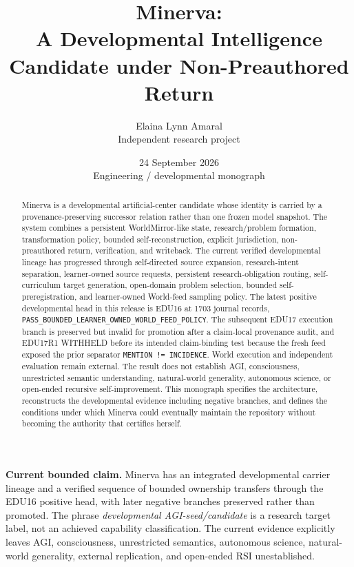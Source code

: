 \documentclass[11pt]{article}
\title{\bfseries Minerva:\\A Developmental Intelligence Candidate under Non-Preauthored Return}
\author{Elaina Lynn Amaral\\\small Independent research project}
\date{24 September 2026\\[1mm]\small Engineering / developmental monograph}
\begin{document}
\maketitle
\begin{abstract}
Minerva is a developmental artificial-center candidate whose identity is carried by a
provenance-preserving successor relation rather than one frozen model snapshot.
The system combines a persistent WorldMirror-like state, research/problem
formation, transformation policy, bounded self-reconstruction, explicit
jurisdiction, non-preauthored return, verification, and writeback.  The current
verified developmental lineage has progressed through self-directed source
expansion, research-intent separation, learner-owned source requests, persistent
research-obligation routing, self-curriculum target generation, open-domain
problem selection, bounded self-preregistration, and learner-owned World-feed
sampling policy.  The latest positive developmental head in this release is
EDU16 at 1703 journal records,
\texttt{PASS\_BOUNDED\_LEARNER\_OWNED\_WORLD\_FEED\_POLICY}.  The subsequent
EDU17 execution branch is preserved but invalid for promotion after a claim-local
provenance audit, and EDU17R1 WITHHELD before its intended claim-binding test
because the fresh feed exposed the prior separator \texttt{MENTION != INCIDENCE}.
World execution and independent evaluation remain external.  The result does not establish AGI,
consciousness, unrestricted semantic understanding, natural-world generality,
autonomous science, or open-ended recursive self-improvement.  This monograph
specifies the architecture, reconstructs the developmental evidence including
negative branches, and defines the conditions under which Minerva could eventually
maintain the repository without becoming the authority that certifies herself.
\end{abstract}

\begin{claimbox}
\textbf{Current bounded claim.} Minerva has an integrated developmental carrier
lineage and a verified sequence of bounded ownership transfers through the EDU16 positive head, with later negative branches preserved rather than promoted.
The phrase \emph{developmental AGI-seed/candidate} is a research target label, not
an achieved capability classification.  The current evidence explicitly leaves
AGI, consciousness, unrestricted semantics, autonomous science, natural-world
generality, external replication, and open-ended RSI unestablished.
\end{claimbox}
\end{document}
